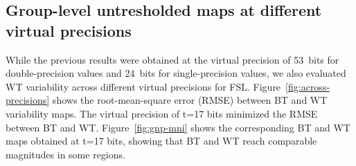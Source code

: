 \documentclass[conference]{IEEEtran}
\begin{document}
\subsection{Group-level untresholded maps at different virtual precisions}

While the previous results were obtained at the virtual precision of 53~bits for double-precision values
and 24~bits for single-precision values, we also evaluated WT variability across different virtual precisions for FSL.
Figure~\ref{fig:across-precisions} shows the root-mean-square error (RMSE) between BT and WT variability maps.
The virtual precision of t=17 bits minimized the RMSE between BT and WT.
Figure~\ref{fig:gnp-mni} shows the corresponding BT and WT maps obtained at t=17 bits, showing 
that BT and WT reach comparable magnitudes in some regions.

  \begin{figure}[ht]
  \end{figure}
\end{document}
